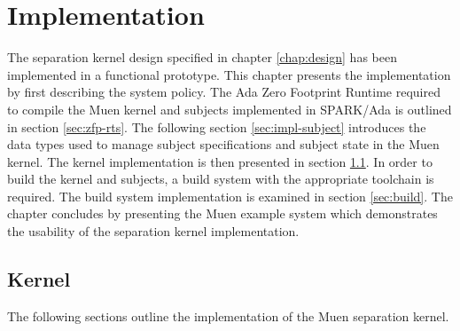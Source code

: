 \chapter{Implementation}\label{chap:impl}
The separation kernel design specified in chapter \ref{chap:design} has been
implemented in a functional prototype. This chapter presents the implementation
by first describing the system policy. The Ada Zero Footprint Runtime required
to compile the Muen kernel and subjects implemented in SPARK/Ada is outlined in
section \ref{sec:zfp-rts}. The following section \ref{sec:impl-subject}
introduces the data types used to manage subject specifications and subject
state in the Muen kernel. The kernel implementation is then presented in
section \ref{sec:kernel}. In order to build the kernel and subjects, a build
system with the appropriate toolchain is required. The build system
implementation is examined in section \ref{sec:build}. The chapter concludes by
presenting the Muen example system which demonstrates the usability of the
separation kernel implementation.





\section{Kernel}\label{sec:kernel}
The following sections outline the implementation of the Muen separation
kernel.












